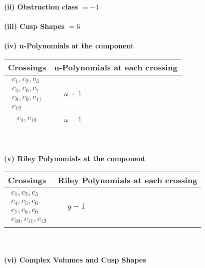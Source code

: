 \documentclass[1p]{elsarticle_modified}
\theoremstyle{definition}
\begin{document}
\flushleft \textbf{(ii) Obstruction class $= -1$}\\~\\
\flushleft \textbf{(iii) Cusp Shapes $= 6$}\\~\\
\newpage\renewcommand{\arraystretch}{1}
\flushleft \textbf{(iv) u-Polynomials at the component}\newline \\
\begin{tabular}{m{50pt}|m{274pt}}
Crossings & \hspace{64pt}u-Polynomials at each crossing \\
\hline $$\begin{aligned}c_{1},c_{2},c_{3}\\c_{5},c_{6},c_{7}\\c_{8},c_{9},c_{11}\\c_{12}\end{aligned}$$&$\begin{aligned}
&u+1
\end{aligned}$\\
\hline $$\begin{aligned}c_{4},c_{10}\end{aligned}$$&$\begin{aligned}
&u-1
\end{aligned}$\\
\hline
\end{tabular}\\~\\
\newpage\renewcommand{\arraystretch}{1}
\flushleft \textbf{(v) Riley Polynomials at the component}\newline \\
\begin{tabular}{m{50pt}|m{274pt}}
Crossings & \hspace{64pt}Riley Polynomials at each crossing \\
\hline $$\begin{aligned}c_{1},c_{2},c_{3}\\c_{4},c_{5},c_{6}\\c_{7},c_{8},c_{9}\\c_{10},c_{11},c_{12}\end{aligned}$$&$\begin{aligned}
&y-1
\end{aligned}$\\
\hline
\end{tabular}\\~\\
\newpage\flushleft \textbf{(vi) Complex Volumes and Cusp Shapes}
\end{document}
